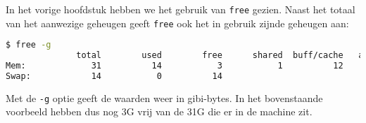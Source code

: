 In het vorige hoofdstuk hebben we het gebruik van \texttt{free} gezien. Naast het totaal van het aanwezige geheugen geeft \texttt{free} ook het in gebruik zijnde geheugen aan:
\begin{lstlisting}[language=bash]
$ free -g
              total        used        free      shared  buff/cache   available
Mem:             31          14           3           1          12          13
Swap:            14           0          14
\end{lstlisting}
Met de \texttt{-g} optie geeft  de waarden weer in gibi-bytes. In het bovenstaande voorbeeld hebben dus nog 3G vrij van de 31G die er in de machine zit.
